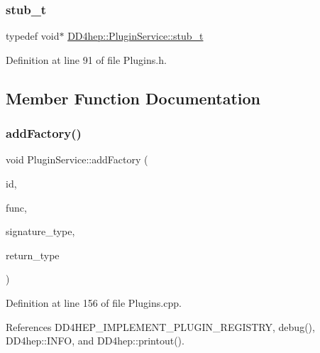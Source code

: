 \subsubsection{\texorpdfstring{stub\+\_\+t}{stub\_t}}
{\footnotesize\ttfamily typedef void$\ast$ \hyperlink{class_d_d4hep_1_1_plugin_service_aa370cd45b770eaabf326eeaa91019382}{D\+D4hep\+::\+Plugin\+Service\+::stub\+\_\+t}}



Definition at line 91 of file Plugins.\+h.



\subsection{Member Function Documentation}
\hypertarget{class_d_d4hep_1_1_plugin_service_a55973b500e0191d1e843b7db9cfd37eb}{}\label{class_d_d4hep_1_1_plugin_service_a55973b500e0191d1e843b7db9cfd37eb} 
\subsubsection{\texorpdfstring{add\+Factory()}{addFactory()}}
{\footnotesize\ttfamily void Plugin\+Service\+::add\+Factory (\begin{DoxyParamCaption}\item[{const std\+::string \&}]{id,  }\item[{\hyperlink{class_d_d4hep_1_1_plugin_service_aa370cd45b770eaabf326eeaa91019382}{stub\+\_\+t}}]{func,  }\item[{const std\+::type\+\_\+info \&}]{signature\+\_\+type,  }\item[{const std\+::type\+\_\+info \&}]{return\+\_\+type }\end{DoxyParamCaption})\hspace{0.3cm}{\ttfamily [static]}}



Definition at line 156 of file Plugins.\+cpp.



References D\+D4\+H\+E\+P\+\_\+\+I\+M\+P\+L\+E\+M\+E\+N\+T\+\_\+\+P\+L\+U\+G\+I\+N\+\_\+\+R\+E\+G\+I\+S\+T\+RY, debug(), D\+D4hep\+::\+I\+N\+FO, and D\+D4hep\+::printout().

\hypertarget{class_d_d4hep_1_1_plugin_service_adcd75004d9f818c73a15c0438db95515}{}\label{class_d_d4hep_1_1_plugin_service_adcd75004d9f818c73a15c0438db95515} 
